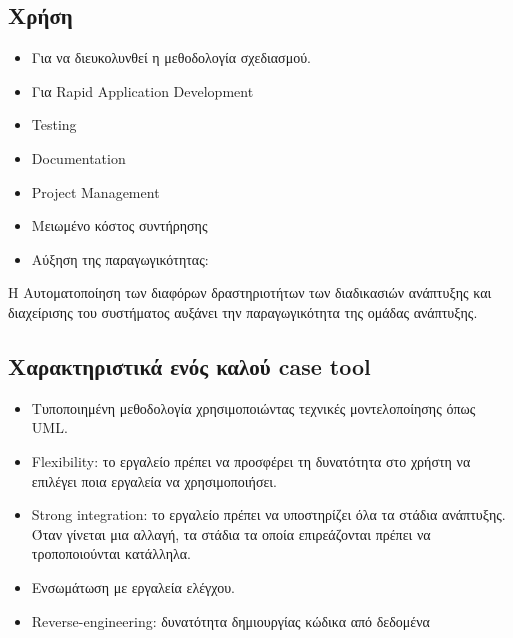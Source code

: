\subsection{Χρήση}
\begin{itemize}
	\item Για να διευκολυνθεί η μεθοδολογία σχεδιασμού. 
	\item Για Rapid Application Development
	\item Testing
	\item Documentation
	\item Project Management
	\item Μειωμένο κόστος συντήρησης
	\item Αύξηση της παραγωγικότητας:
\end{itemize}
H Αυτοματοποίηση των διαφόρων δραστηριοτήτων των διαδικασιών ανάπτυξης και διαχείρισης του συστήματος αυξάνει την παραγωγικότητα της ομάδας ανάπτυξης.

\subsection{Χαρακτηριστικά ενός καλού case tool}
\begin{itemize}
	\item Τυποποιημένη μεθοδολογία χρησιμοποιώντας τεχνικές μοντελοποίησης όπως UML.
	\item Flexibility: το εργαλείο πρέπει να προσφέρει τη δυνατότητα στο χρήστη να επιλέγει ποια εργαλεία να χρησιμοποιήσει.
	\item Strong integration: το εργαλείο πρέπει να υποστηρίζει όλα τα στάδια ανάπτυξης. Όταν γίνεται μια αλλαγή, τα στάδια τα οποία επιρεάζονται πρέπει να τροποποιούνται κατάλληλα.
	\item Ενσωμάτωση με εργαλεία ελέγχου.
	\item Reverse-engineering: δυνατότητα δημιουργίας κώδικα από δεδομένα
\end{itemize}

	
